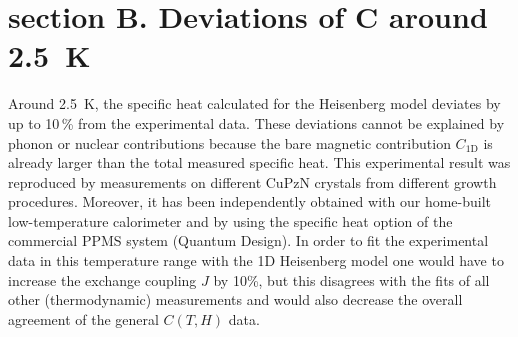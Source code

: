 \documentclass[12pt]{article}
\begin{document}
	
\section*{section B. Deviations of $\mathbf{C}$ around 2.5~K}

Around 2.5~K, the specific heat calculated for the Heisenberg model deviates by up to 10\,\% from the experimental data. These deviations cannot be explained by phonon or nuclear contributions because the bare magnetic contribution $C_\mathrm{1D}$ is already larger than the total measured specific heat. This experimental result was reproduced by measurements on different CuPzN crystals from different growth procedures. Moreover, it has been independently obtained with our home-built low-temperature calorimeter and by using the specific heat option of the commercial PPMS system (Quantum Design). In order to fit the experimental data in this temperature range with the 1D Heisenberg model one would have to increase the exchange coupling $J$ by 10\%, but this disagrees with the fits of all other (thermodynamic) measurements and would also decrease the overall agreement of the general $C(T,H)$ data. 
\end{document}
